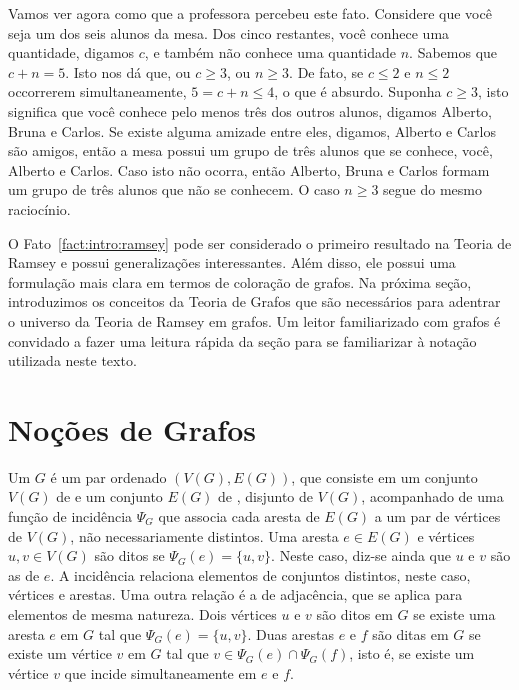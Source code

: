 Vamos ver agora como que a professora percebeu este fato. Considere que você seja um dos seis alunos da mesa. Dos cinco restantes, você conhece uma quantidade, digamos $c$, e também não conhece uma quantidade $n$. Sabemos que $c + n = 5$. Isto nos dá que, ou $c \geq 3$, ou $n \geq 3$. De fato, se $c \leq 2$ e $n \leq 2$ occorrerem simultaneamente, $5 = c + n \leq 4$, o que é absurdo. Suponha $c \geq 3$, isto significa que você conhece pelo menos três dos outros alunos, digamos Alberto, Bruna e Carlos. Se existe alguma amizade entre eles, digamos, Alberto e Carlos são amigos, então a mesa possui um grupo de três alunos que se conhece, você, Alberto e Carlos. Caso isto não ocorra, então Alberto, Bruna e Carlos formam um grupo de três alunos que não se conhecem. O caso $n \geq 3$ segue do mesmo raciocínio.

O Fato~\ref{fact:intro:ramsey} pode ser considerado o primeiro resultado na Teoria de Ramsey e possui generalizações interessantes. Além disso, ele possui uma formulação mais clara em termos de coloração de grafos. Na próxima seção, introduzimos os conceitos da Teoria de Grafos que são necessários para adentrar o universo da Teoria de Ramsey em grafos. Um leitor familiarizado com grafos é convidado a fazer uma leitura rápida da seção para se familiarizar à notação utilizada neste texto.


\section{Noções de Grafos}

Um  $G$ é um par ordenado $(V(G), E(G))$, que consiste em um conjunto $V(G)$ de  e um conjunto $E(G)$ de , disjunto de $V(G)$, acompanhado de uma função de incidência $\Psi_G$ que associa cada aresta de $E(G)$ a um par de vértices de $V(G)$, não necessariamente distintos.
Uma aresta $e \in E(G)$ e vértices $u, v \in V(G)$ são ditos  se $\Psi_G(e) = \{u,v\}$. Neste caso, diz-se ainda que $u$ e $v$ são as  de $e$. A incidência relaciona elementos de conjuntos distintos, neste caso, vértices e arestas.
Uma outra relação é a de adjacência, que se aplica para elementos de mesma natureza. Dois vértices $u$ e $v$ são ditos  em $G$ se existe uma aresta $e$ em $G$ tal que $\Psi_G(e) = \{u,v\}$. Duas arestas $e$ e $f$ são ditas  em $G$ se existe um vértice $v$ em $G$ tal que $v \in \Psi_G(e) \cap \Psi_G(f)$, isto é, se existe um vértice $v$ que incide simultaneamente em $e$ e $f$.

